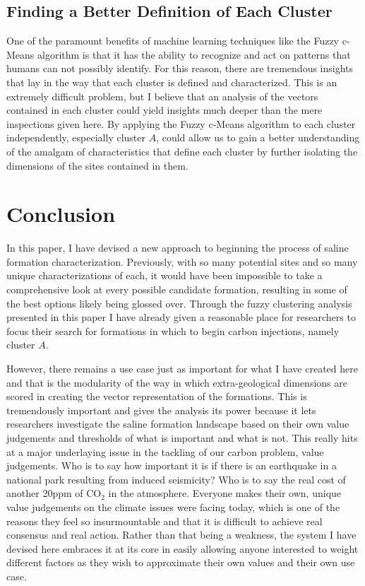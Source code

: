 \documentclass[letterpaper, 12pt]{article}
\begin{document}
\subsection{Finding a Better Definition of Each Cluster}
One of the paramount benefits of machine learning techniques like the Fuzzy c-Means algorithm is that it has the ability to recognize and act on patterns that humans can not possibly identify. For this reason, there are tremendous insights that lay in the way that each cluster is defined and characterized. 
This is an extremely difficult problem, but I believe that an analysis of the vectors contained in each cluster could yield insights much deeper than the mere inspections given here. By applying the Fuzzy c-Means algorithm to each cluster independently, especially cluster $A$, could allow us to gain a better understanding of the amalgam of characteristics that define each cluster by further isolating the dimensions of the sites contained in them. 

\section{Conclusion}
\par In this paper, I have devised a new approach to beginning the process of saline formation characterization. Previously, with so many potential sites and so many unique characterizations of each, it would have been impossible to take a comprehensive look at every possible candidate formation, resulting in some of the best options likely being glossed over. Through the fuzzy clustering analysis presented in this paper I have already given a reasonable place for researchers to focus their search for formations in which to begin carbon injections, namely cluster $A$. 

\par However, there remains a use case just as important for what I have created here and that is the modularity of the way in which extra-geological dimensions are scored in creating the vector representation of the formations. This is tremendously important and gives the analysis its power because it lets researchers investigate the saline formation landscape based on their own value judgements and thresholds of what is important and what is not. This really hits at a major underlaying issue in the tackling of our carbon problem, value judgements. Who is to say how important it is if there is an earthquake in a national park resulting from induced seismicity? Who is to say the real cost of another 20ppm of CO$_2$ in the atmosphere. Everyone makes their own, unique value judgements on the climate issues were facing today, which is one of the reasons they feel so insurmountable and that it is difficult to achieve real consensus and real action. Rather than that being a weakness, the system I have devised here embraces it at its core in easily allowing anyone interested to weight different factors as they wish to approximate their own values and their own use case. 
\end{document}
